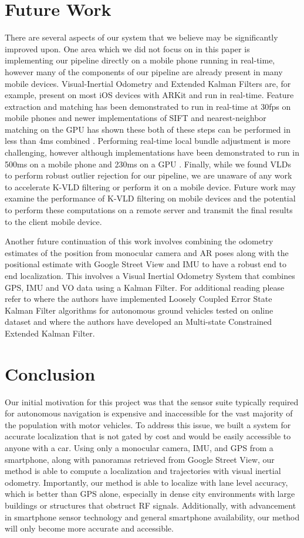 \documentclass[conference]{IEEEtran}
\begin{document}
\section{Future Work}
There are several aspects of our system that we believe may be significantly improved upon. One area which we did not focus on in this paper is implementing our pipeline directly on a mobile phone running in real-time, however many of the components of our pipeline are already present in many mobile devices. Visual-Inertial Odometry and Extended Kalman Filters are, for example, present on most iOS devices with ARKit and run in real-time. Feature extraction and matching has been demonstrated to run in real-time at 30fps on mobile phones \cite{siftmobile} and newer implementations of SIFT and nearest-neighbor matching on the GPU has shown these both of these steps can be performed in less than 4ms combined \cite{siftgpu}. Performing real-time local bundle adjustment is more challenging, however although implementations have been demonstrated to run in 500ms on a mobile phone \cite{mobileba} and 230ms on a GPU \cite{gpuba}. Finally, while we found VLDs to perform robust outlier rejection for our pipeline, we are unaware of any work to accelerate K-VLD filtering or perform it on a mobile device. Future work may examine the performance of K-VLD filtering on mobile devices and the potential to perform these computations on a remote server and transmit the final results to the client mobile device.

Another future continuation of this work involves combining the odometry estimates of the position from monocular camera and AR poses along with the positional estimate with Google Street View and IMU to have a robust end to end localization. This involves a Visual Inertial Odometry System that combines GPS, IMU and VO data using a Kalman Filter. For additional reading please refer to \cite{7} where the authors have implemented Loosely Coupled Error State Kalman Filter algorithms for autonomous ground vehicles tested on online dataset and \cite{8} where the authors have developed an Multi-state Constrained Extended Kalman Filter.

\section{Conclusion}
Our initial motivation for this project was that the sensor suite typically required for autonomous navigation is expensive and inaccessible for the vast majority of the population with motor vehicles. To address this issue, we built a system for accurate localization that is not gated by cost and would be easily accessible to anyone with a car. Using only a monocular camera, IMU, and GPS from a smartphone, along with panoramas retrieved from Google Street View, our method is able to compute a localization and trajectories with visual inertial odometry. Importantly, our method is able to localize with lane level accuracy, which is better than GPS alone, especially in dense city environments with large buildings or structures that obstruct RF signals. Additionally, with advancement in smartphone sensor technology and general smartphone availability, our method will only become more accurate and accessible. 
\end{document}

